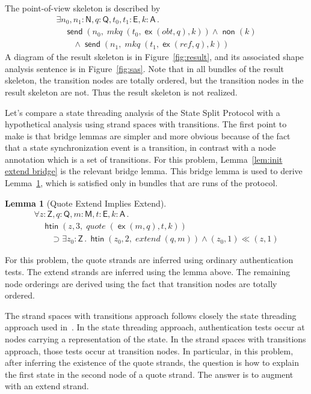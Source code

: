 \documentclass[12pt]{article}
\newtheorem{lem}[thm]{Lemma}
\newcommand{\cn}[1]{\ensuremath{\operatorname{\mathsf{#1}}}}
\newcommand{\fn}[1]{\ensuremath{\operatorname{\mathit{#1}}}}
\newcommand{\srt}[1]{\ensuremath{\mathsf{#1}}}
\newcommand{\gtag}[1]{\ensuremath{\mathit{#1}}}
\newcommand{\typ}{\mathbin:}
\newcommand{\all}[1]{\forall#1\mathpunct.}
\newcommand{\some}[1]{\exists#1\mathpunct.}
\newcommand{\extend}{\cn{ex}}
\begin{document}
The point-of-view skeleton is described by
\[
\begin{array}{l}
\some{n_0, n_1\typ\srt{N}, q\typ\srt{Q}, t_0,t_1\typ\srt{E},
k\typ\srt{A}}\\
\quad\cn{send}(n_0, \fn{mkq}(t_0, \extend(\gtag{obt}, q),k))\land\cn{non}(k)\\
\qquad\land\cn{send}(n_1, \fn{mkq}(t_1, \extend(\gtag{ref}, q),k))
\end{array}
\]
A diagram of the result skeleton is in Figure~\ref{fig:result}, and
its associated shape analysis sentence is in Figure~\ref{fig:sas}.
Note that in all bundles of the result skeleton, the transition nodes
are totally ordered, but the transition nodes in the result skeleton
are not.  Thus the result skeleton is not realized.

Let's compare a state threading analysis of the State Split Protocol
with a hypothetical analysis using strand spaces with transitions.
The first point to make is that bridge lemmas are simpler and more
obvious because of the fact that a state synchronization event is a
transition, in contrast with a node annotation which is a set of
transitions.  For this problem, Lemma~\ref{lem:init extend bridge} is
the relevant bridge lemma.  This bridge lemma is used to derive
Lemma~\ref{lem:quote extend implies extend}, which is satisfied only
in bundles that are runs of the protocol.

\begin{lem}[Quote Extend Implies Extend]
\label{lem:quote extend implies extend}
\begingroup\rm
\[\begin{array}{l}
\all{z\typ\srt{Z},q\typ\srt{Q},m\typ\srt{M},t\typ\srt{E}, k\typ\srt{A}}\\
\quad\cn{htin}(z, 3, \fn{quote}(\extend(m,q),t,k))\\
\qquad\supset\some{z_0\typ\srt{Z}}
\cn{htin}(z_0, 2, \fn{extend}(q, m))
\land(z_0,1)\ll(z,1)
\end{array}
\]
\endgroup
\end{lem}

For this problem, the quote strands are inferred using ordinary
authentication tests.  The extend strands are inferred using the lemma
above.  The remaining node orderings are derived using the fact that
transition nodes are totally ordered.

The strand spaces with transitions approach follows closely the state
threading approach used in~\cite{RamsdellEtAl14}.  In the state
threading approach, authentication tests occur at nodes carrying a
representation of the state.  In the strand spaces with transitions
approach, those tests occur at transition nodes.  In particular, in
this problem, after inferring the existence of the quote strands,
the question is how to explain the first state in the second node of a
quote strand.  The answer is to augment with an extend strand.
\end{document}
